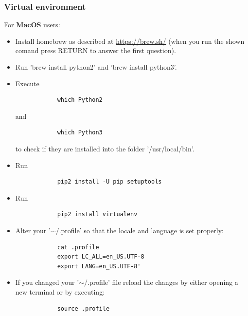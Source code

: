 \documentclass[a4paper, 11pt, fleqn]{memoir}
\begin{document}
\subsubsection{Virtual environment}
For \textbf{MacOS} users:
\begin{itemize}
    \item Install homebrew as described at \url{https://brew.sh/} (when you run the shown comand press RETURN to answer the first question).
    \item Run 'brew install python2' and 'brew install python3'.
    \item Execute
          \begin{verbatim}
            which Python2
        \end{verbatim}
          and
          \begin{verbatim}
            which Python3
        \end{verbatim}
          to check if they are installed into the folder '/usr/local/bin'.
    \item Run
          \begin{verbatim}
            pip2 install -U pip setuptools
        \end{verbatim}
    \item Run
          \begin{verbatim}
            pip2 install virtualenv
        \end{verbatim}
    \item
          Alter your '$\sim$/.profile' so that the locale and language is set properly:
          \begin{verbatim}
            cat .profile
            export LC_ALL=en_US.UTF-8
            export LANG=en_US.UTF-8'
        \end{verbatim}
    \item If you changed your '$\sim$/.profile' file reload the changes by either opening a new terminal or by executing:
          \begin{verbatim}
            source .profile
        \end{verbatim}
\end{itemize}
\end{document}
